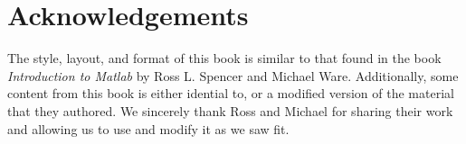 \chapter*{Acknowledgements}

The style, layout, and format of this book is similar to that found
in the book {\it Introduction to Matlab} by Ross L. Spencer and
Michael Ware.  Additionally, some content from this book is either
idential to, or a modified version of the material that they authored.
We sincerely thank Ross and Michael for sharing their work and
allowing us to use and modify it as we saw fit.
